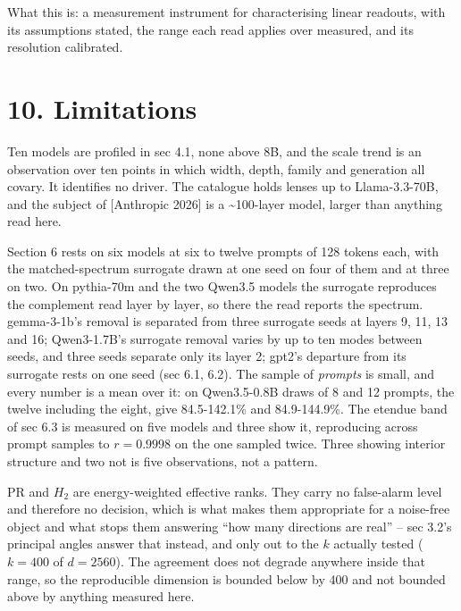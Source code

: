 \documentclass[10pt,letterpaper,twocolumn]{article}
\begin{document}
What this is: a measurement instrument for characterising linear readouts, with its assumptions stated, the range each read applies over measured, and its resolution calibrated.

\section{10. Limitations}\label{10-limitations}

Ten models are profiled in sec 4.1, none above 8B, and the scale trend is an observation over ten points in which width, depth, family and generation all covary. It identifies no driver. The catalogue holds lenses up to Llama-3.3-70B, and the subject of {[}Anthropic 2026{]} is a \textasciitilde100-layer model, larger than anything read here.

Section 6 rests on six models at six to twelve prompts of 128 tokens each, with the matched-spectrum surrogate drawn at one seed on four of them and at three on two. On pythia-70m and the two Qwen3.5 models the surrogate reproduces the complement read layer by layer, so there the read reports the spectrum. gemma-3-1b's removal is separated from three surrogate seeds at layers 9, 11, 13 and 16; Qwen3-1.7B's surrogate removal varies by up to ten modes between seeds, and three seeds separate only its layer 2; gpt2's departure from its surrogate rests on one seed (sec 6.1, 6.2). The sample of \emph{prompts} is small, and every number is a mean over it: on Qwen3.5-0.8B draws of 8 and 12 prompts, the twelve including the eight, give 84.5-142.1\% and 84.9-144.9\%. The etendue band of sec 6.3 is measured on five models and three show it, reproducing across prompt samples to \(r=0.9998\) on the one sampled twice. Three showing interior structure and two not is five observations, not a pattern.

\(\mathrm{PR}\) and \(H_2\) are energy-weighted effective ranks. They carry no false-alarm level and therefore no decision, which is what makes them appropriate for a noise-free object and what stops them answering ``how many directions are real'' -- sec 3.2's principal angles answer that instead, and only out to the \(k\) actually tested (\(k=400\) of \(d=2560\)). The agreement does not degrade anywhere inside that range, so the reproducible dimension is bounded below by 400 and not bounded above by anything measured here.
\end{document}
